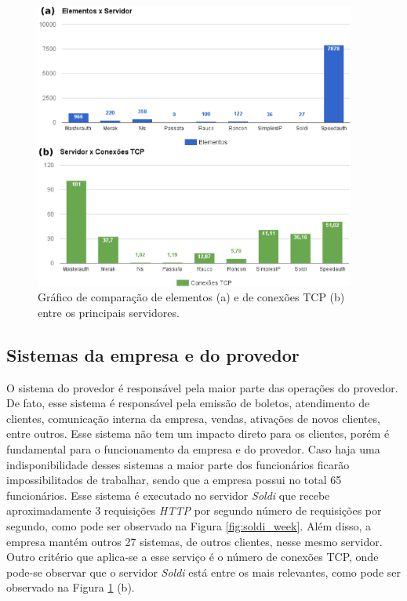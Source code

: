 \begin{figure}[h!]
 \centering
 \includegraphics[width=400px]{img/elementos_tcp.eps}
 \caption{Gráfico de comparação de elementos (a) e de conexões TCP (b) entre os principais servidores.}
 \label{fig:elementos_tcp}
\end{figure}

\subsection{Sistemas da empresa e do provedor}
\label{section:sistemas}

O sistema do provedor é responsável pela maior parte das operações do provedor. De fato, esse sistema é responsável pela emissão de boletos, 
atendimento de clientes, comunicação interna da empresa, vendas, ativações de novos clientes, entre outros. Esse sistema não tem um impacto 
direto para os clientes, porém é fundamental para o funcionamento da empresa e do provedor. Caso haja uma indisponibilidade desses sistemas 
a maior parte dos funcionários ficarão impossibilitados de trabalhar, sendo que a empresa possui no total 65 funcionários.
Esse sistema é executado no servidor \textit{Soldi} que recebe aproximadamente 3 requisições \textit{HTTP} \cite{tanenbaum2011} por segundo 
número de requisições por segundo, como pode ser observado na Figura \ref{fig:soldi_week}. Além disso, a empresa mantém outros 27 sistemas, 
de outros clientes, nesse mesmo servidor. 
Outro critério que aplica-se a esse serviço é o número de conexões \ac{TCP}, onde pode-se observar que o servidor \textit{Soldi} está 
entre os mais relevantes, como pode ser observado na Figura \ref{fig:elementos_tcp} (b). 

